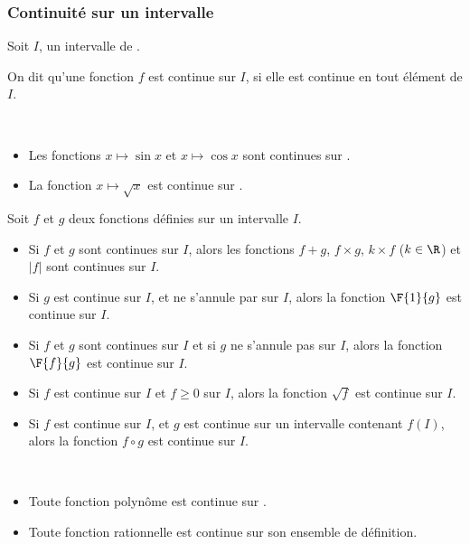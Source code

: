 \subsubsection{Continuité sur un intervalle}%
\begin{definition}
Soit $I$, un intervalle de \R.
\par On dit qu'une fonction $f$ est continue sur $I$, si elle est continue en tout élément de $I$.
\end{definition}\\
\begin{exemple}[s]
\begin{itemize}
	\item Les fonctions $x\longmapsto \sin x$ et $x\longmapsto \cos x$ sont continues sur \R.
	\item La fonction $x\longmapsto \sqrt{x}$ est continue sur .
\end{itemize}
\end{exemple}
\begin{propriete}[s]
	\par Soit $f$ et $g$ deux fonctions définies sur un intervalle $I$.
	\begin{itemize}
		\item Si $f$ et $g$ sont continues sur $I$, alors les fonctions $f+g$, $f\times g$, $k\times f$ ($k\in \R$) et $\lvert f\rvert$ sont continues sur $I$.
		\item Si $g$ est continue sur $I$, et ne s'annule par sur $I$, alors la fonction $\F{1}{g}$ est continue sur $I$.
		\item Si $f$ et $g$ sont continues sur $I$ et si $g$ ne s'annule pas sur $I$, alors la fonction $\F{f}{g}$ est continue sur $I$.
\item Si $f$ est continue sur $I$ et $f\geq 0$ sur $I$, alors la fonction $\sqrt{f}$ est continue sur $I$.
\item Si $f$ est continue sur $I$, et $g$ est continue sur un intervalle contenant $f(I)$, alors la fonction $f\circ g$ est continue sur $I$.
\end{itemize}
\end{propriete}\\
\begin{exemple}[s]
	\begin{itemize}
			\item Toute fonction polynôme est continue sur \R.
			\item Toute fonction rationnelle est continue sur son ensemble de définition.
	\end{itemize}
\end{exemple}\vspace*{-0.5cm}
